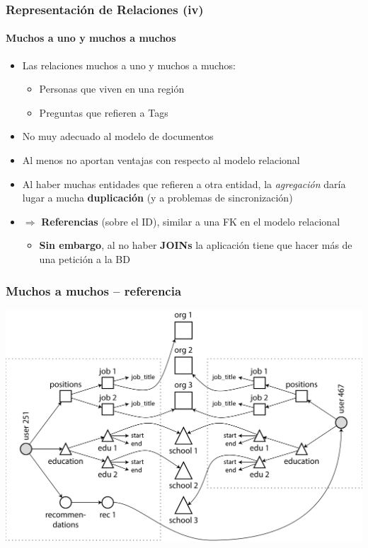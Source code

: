 \documentclass[14pt]{beamer}
\begin{document}
\begin{frame}
  \frametitle{Representación de Relaciones (iv)}
  \framesubtitle{Muchos a uno y muchos a muchos}
  \begin{itemize}
  \item Las relaciones muchos a uno y muchos a muchos:
    \begin{itemize}
    \item Personas que viven en una región
\item Preguntas que refieren a Tags
    \end{itemize}
  \item No muy adecuado al modelo de documentos
\item Al menos no aportan ventajas con respecto al modelo relacional
\item Al haber muchas entidades que refieren a otra entidad,
  la {\em agregación} daría lugar a mucha {\bf duplicación} (y a
  problemas de sincronización)
\item {\color{red} $\Rightarrow$} {\bf Referencias} (sobre el ID), similar a
  una FK en el modelo relacional
  \begin{itemize}
  \item {\bf Sin embargo}, al no haber {\bf JOINs} la aplicación tiene que
    hacer más de una petición a la BD
  \end{itemize}
  \end{itemize}
\end{frame}

\begin{frame}
  \frametitle{Muchos a muchos -- referencia}
\includegraphics[width=\textwidth]{img/many-to-many}
\end{frame}
\end{document}
